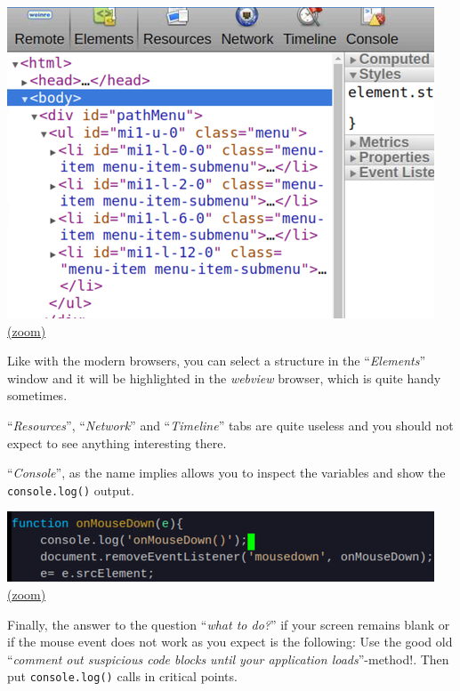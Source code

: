 \documentclass[11pt]{article}
\begin{document}
    \includegraphics{2019-12-25_weinre_server_element_inspection.png}
\href{img/2019-12-25_weinre_server_element_inspection.png}{(zoom)}

    Like with the modern browsers, you can select a structure in the
``\emph{Elements}'' window and it will be highlighted in the
\emph{webview} browser, which is quite handy sometimes.

    ``\emph{Resources}'', ``\emph{Network}'' and ``\emph{Timeline}'' tabs
are quite useless and you should not expect to see anything interesting
there.

    ``\emph{Console}'', as the name implies allows you to inspect the
variables and show the \texttt{console.log()} output.

    \includegraphics{2019-12-25_weinre_server_consolelog_code.png}
\href{img/2019-12-25_weinre_server_consolelog_code.png}{(zoom)}

    Finally, the answer to the question ``\emph{what to do?}'' if your
screen remains blank or if the mouse event does not work as you expect
is the following: Use the good old ``\emph{comment out suspicious code
blocks until your application loads}''-method!. Then put
\texttt{console.log()} calls in critical points.
\end{document}
